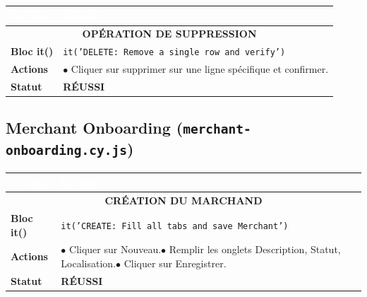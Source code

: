 \vspace{0.5cm}
\noindent
\begin{minipage}{\textwidth}
\renewcommand{\arraystretch}{1.5}
\begin{tabular}{|p{3cm}|p{12.5cm}|}
\hline
\rowcolor{primary}
\textcolor{white}{\textbf{Section}} & \textcolor{white}{\textbf{Détails}} \\
\hline
\multicolumn{2}{|c|}{\cellcolor{gray!20}\textbf{OPÉRATION DE SUPPRESSION}} \\
\hline
\textbf{Bloc it()} & \texttt{it('DELETE: Remove a single row and verify')} \\
\hline
\textbf{Actions} & $\bullet$ Cliquer sur supprimer sur une ligne spécifique et confirmer. \\
\hline
\textbf{Statut} & \textcolor{success}{\textbf{RÉUSSI}} \\
\hline
\end{tabular}
\end{minipage}


\subsection{Merchant Onboarding (\texttt{merchant-onboarding.cy.js})}

\vspace{0.3cm}
\noindent
\begin{minipage}{\textwidth}
\renewcommand{\arraystretch}{1.5}
\begin{tabular}{|p{3cm}|p{12.5cm}|}
\hline
\rowcolor{primary}
\textcolor{white}{\textbf{Section}} & \textcolor{white}{\textbf{Détails}} \\
\hline
\multicolumn{2}{|c|}{\cellcolor{gray!20}\textbf{CRÉATION DU MARCHAND}} \\
\hline
\textbf{Bloc it()} & \texttt{it('CREATE: Fill all tabs and save Merchant')} \\
\hline
\textbf{Actions} & $\bullet$ Cliquer sur Nouveau.\newline $\bullet$ Remplir les onglets Description, Statut, Localisation.\newline $\bullet$ Cliquer sur Enregistrer. \\
\hline
\textbf{Statut} & \textcolor{success}{\textbf{RÉUSSI}} \\
\hline
\end{tabular}
\end{minipage}

